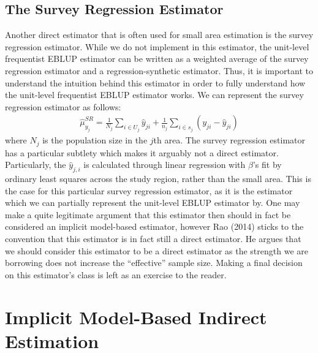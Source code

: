 \documentclass[12pt,twoside]{reedthesis}
\begin{document}
\hypertarget{the-survey-regression-estimator}{%
\subsection{The Survey Regression Estimator}\label{the-survey-regression-estimator}}

Another direct estimator that is often used for small area estimation is the survey regression estimator. While we do not implement in this estimator, the unit-level frequentist EBLUP estimator can be written as a weighted average of the survey regression estimator and a regression-synthetic estimator. Thus, it is important to understand the intuition behind this estimator in order to fully understand how the unit-level frequentist EBLUP estimator works. We can represent the survey regression estimator as follows:
\begin{align}
\hat \mu_{y_j}^{SR} = \frac{1}{N_j} \sum_{i \in U_j} \hat y_{ji} +
\frac{1}{n_j} \sum_{i \in s_j} (y_{ji} - \hat y_{ji})
\end{align}
where \(N_j\) is the population size in the \(j\)th area. The survey regression estimator has a particular subtlety which makes it arguably not a direct estimator. Particularly, the \(\hat y_{j,i}\) is calculated through linear regression with \(\beta\)'s fit by ordinary least squares across the study region, rather than the small area. This is the case for this particular survey regression estimator, as it is the estimator which we can partially represent the unit-level EBLUP estimator by. One may make a quite legitimate argument that this estimator then should in fact be considered an implicit model-based estimator, however Rao (2014) sticks to the convention that this estimator is in fact still a direct estimator. He argues that we should consider this estimator to be a direct estimator as the strength we are borrowing does not increase the ``effective'' sample size. Making a final decision on this estimator's class is left as an exercise to the reader.

\hypertarget{implicit-model-based-indirect-estimation}{%
\section{Implicit Model-Based Indirect Estimation}\label{implicit-model-based-indirect-estimation}}
\end{document}
